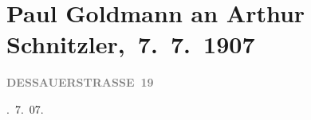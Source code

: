 

\renewcommand{\erwaehntePersonen}{Personen: Clementine Goldmann, Fedor Mamroth, Olga Schnitzler}
\renewcommand{\erwaehnteOrte}{Orte: Berlin, Dessauer Straße, Frankfurt am Main, Marienbad, Wien}
\renewcommand{\erwaehnteWerke}{}
\section[ Paul Goldmann an Arthur Schnitzler, 7. 7. 1907]{Paul Goldmann an Arthur Schnitzler, 7. 7. 1907}
\nopagebreak{}
\rehead{ }\normalsize\beginnumbering{}
\toendnotes[C]{\smallbreak\pagebreak[2]}
\toendnotes[C]{\smallbreak}
\pstart
           \noindent{}\raggedleft{}{\pb}\textcolor{pink}{\textcolor{gray}{\textbf{DESSAUERSTRASSE 19}}}{}\ledrightnote{\textcolor{pink}{Dessauer Straße}}\pend
           
. 7. 07.\pend
           
